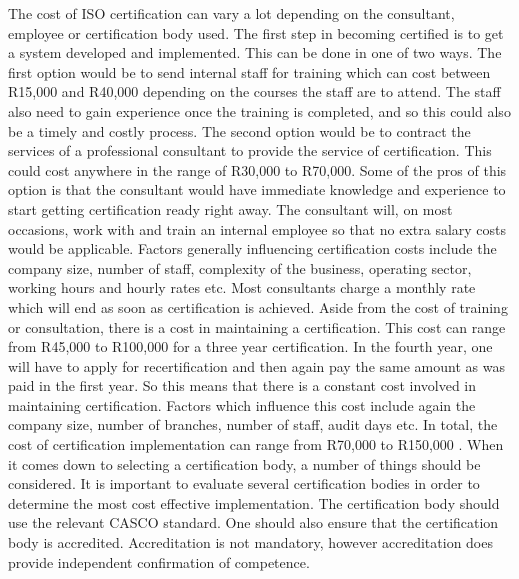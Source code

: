\documentclass[11pt,a4paper]{article}
\begin{document}
The cost of ISO certification can vary a lot depending on the consultant, employee or certification body used. The first step in becoming certified is to get a system developed and implemented. This can be done in one of two ways. The first option would be to send internal staff for training which can cost between R15,000 and R40,000 depending on the courses the staff are to attend. The staff also need to gain experience once the training is completed, and so this could also be a timely and costly process. The second option would be to contract the services of a  professional consultant to provide the service of certification. This could cost anywhere in the range of R30,000 to R70,000. Some of the pros of this option is that the consultant would have immediate knowledge and experience to start getting certification ready right away. The consultant will, on most occasions, work with and train an internal employee so that no extra salary costs would be applicable. Factors generally influencing certification costs include the company size, number of staff, complexity of the business, operating sector, working hours and hourly rates etc. Most consultants charge a monthly rate which will end as soon as certification is achieved. Aside from the cost of training or consultation, there is a cost in maintaining a certification. This cost can range from R45,000 to R100,000 for a three year certification. In the fourth year, one will have to apply for recertification and then again pay the same amount as was paid in the first year. So this means that there is a constant cost involved in maintaining certification. Factors which influence this cost include again the company size, number of branches, number of staff, audit days etc. In total, the cost of certification implementation can range from R70,000 to R150,000 \cite{_iso_????-1}. When it comes down to selecting a certification body, a number of things should be considered. It is important to evaluate several certification bodies in order to determine the most cost effective implementation. The certification body should use the relevant CASCO standard. One should also ensure that the certification body is accredited. Accreditation is not mandatory, however accreditation does provide independent confirmation of competence. \cite{_iso_????-2}

\vspace{5mm}
\end{document}
